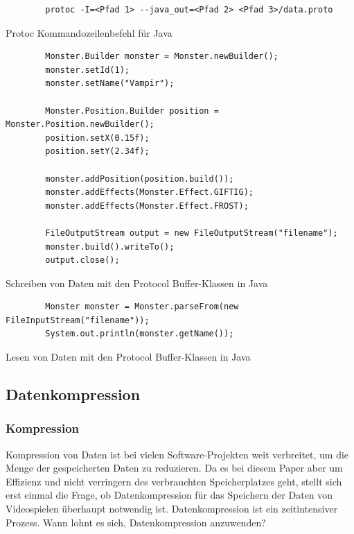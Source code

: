 \begin{listing}[htp]
    \begin{verbatim} 
        protoc -I=<Pfad 1> --java_out=<Pfad 2> <Pfad 3>/data.proto
    \end{verbatim}
    \caption{Protoc Kommandozeilenbefehl für Java}
    \label{lst:protocJava}
\end{listing}

\begin{listing}[htp]
    \begin{verbatim} 
        Monster.Builder monster = Monster.newBuilder();
        monster.setId(1);
        monster.setName("Vampir");

        Monster.Position.Builder position = Monster.Position.newBuilder();
        position.setX(0.15f);
        position.setY(2.34f);

        monster.addPosition(position.build());
        monster.addEffects(Monster.Effect.GIFTIG);
        monster.addEffects(Monster.Effect.FROST);

        FileOutputStream output = new FileOutputStream("filename");
        monster.build().writeTo();
        output.close();
    \end{verbatim}
    \caption{Schreiben von Daten mit den Protocol Buffer-Klassen in Java}
    \label{lst:protobufJavaWrite}
\end{listing}

\begin{listing}[htp]
    \begin{verbatim} 
        Monster monster = Monster.parseFrom(new FileInputStream("filename"));
        System.out.println(monster.getName());
    \end{verbatim}
    \caption{Lesen von Daten mit den Protocol Buffer-Klassen in Java}
    \label{lst:protobufJavaRead}
\end{listing}


\subsection{Datenkompression}
\subsubsection{Kompression}
Kompression von Daten ist bei vielen Software-Projekten weit verbreitet, um die Menge der gespeicherten Daten zu reduzieren. Da es bei diesem Paper aber um Effizienz und nicht verringern des verbrauchten Speicherplatzes geht, stellt sich erst einmal die Frage, ob Datenkompression für das Speichern der Daten von Videospielen überhaupt notwendig ist. Datenkompression ist ein zeitintensiver Prozess. Wann lohnt es sich, Datenkompression anzuwenden? 

